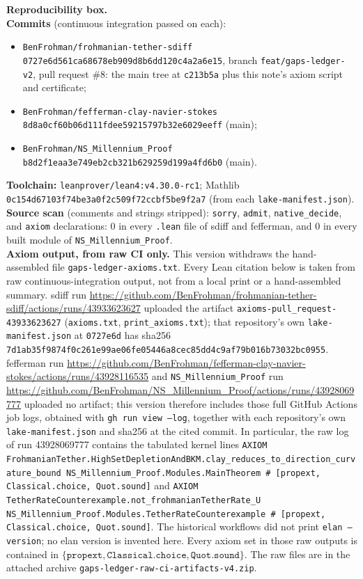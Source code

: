 \documentclass[11pt]{article}
\theoremstyle{plain}
\theoremstyle{definition}
\theoremstyle{remark}
\newcommand{\sdifffull}{0727e6d561ca68678eb909d8b6dd120c4a2a6e15}
\newcommand{\fffull}{8d8a0cf60b06d111fdee59215797b32e6029eeff}
\newcommand{\nsfull}{b8d2f1eaa3e749eb2cb321b629259d199a4fd6b0}
\begin{document}
\begin{framed}\small
\noindent\textbf{Reproducibility box.}\\[2pt]
\textbf{Commits} (continuous integration passed on each):
\begin{itemize}[leftmargin=1.2em,itemsep=0pt,topsep=2pt]
\item \texttt{BenFrohman/frohmanian-tether-sdiff} \nolinkurl{\sdifffull}, branch \texttt{feat/gaps-ledger-v2}, pull request \#8: the main tree at \texttt{c213b5a} plus this note's axiom script and certificate;
\item \texttt{BenFrohman/fefferman-clay-navier-stokes} \nolinkurl{\fffull} (main);
\item \texttt{BenFrohman/NS\_Millennium\_Proof} \nolinkurl{\nsfull} (main).
\end{itemize}
\textbf{Toolchain:} \texttt{leanprover/lean4:v4.30.0-rc1}; Mathlib \nolinkurl{0c154d67103f74be3a0f2c509f72ccbf5be9f2a7} (from each \texttt{lake-manifest.json}).\\[2pt]
\textbf{Source scan} (comments and strings stripped): \texttt{sorry}, \texttt{admit}, \texttt{native\_decide}, and \texttt{axiom} declarations: 0 in every \texttt{.lean} file of sdiff and fefferman, and 0 in every built module of \texttt{NS\_Millennium\_Proof}.\\[2pt]
\textbf{Axiom output, from raw CI only.} This version withdraws the hand-assembled file \texttt{gaps-ledger-axioms.txt}. Every Lean citation below is taken from raw continuous-integration output, not from a local print or a hand-assembled summary. sdiff run \url{https://github.com/BenFrohman/frohmanian-tether-sdiff/actions/runs/43933623627} uploaded the artifact \texttt{axioms-pull\_request-43933623627} (\texttt{axioms.txt}, \texttt{print\_axioms.txt}); that repository's own \texttt{lake-manifest.json} at \texttt{0727e6d} has sha256 \texttt{7d1ab35f9874f0c261e99ae06fe05446a8cec85dd4c9af79b016b73032bc0955}. fefferman run \url{https://github.com/BenFrohman/fefferman-clay-navier-stokes/actions/runs/43928116535} and \texttt{NS\_Millennium\_Proof} run \url{https://github.com/BenFrohman/NS\_Millennium\_Proof/actions/runs/43928069777} uploaded no artifact; this version therefore includes those full GitHub Actions job logs, obtained with \texttt{gh run view --log}, together with each repository's own \texttt{lake-manifest.json} and sha256 at the cited commit. In particular, the raw log of run 43928069777 contains the tabulated kernel lines \texttt{AXIOM FrohmanianTether.HighSetDepletionAndBKM.clay\_reduces\_to\_direction\_curvature\_bound NS\_Millennium\_Proof.Modules.MainTheorem \# [propext, Classical.choice, Quot.sound]} and \texttt{AXIOM TetherRateCounterexample.not\_frohmanianTetherRate\_U NS\_Millennium\_Proof.Modules.TetherRateCounterexample \# [propext, Classical.choice, Quot.sound]}. The historical workflows did not print \texttt{elan --version}; no elan version is invented here. Every axiom set in those raw outputs is contained in \(\{\texttt{propext},\texttt{Classical.choice},\texttt{Quot.sound}\}\). The raw files are in the attached archive \texttt{gaps-ledger-raw-ci-artifacts-v4.zip}.\\[2pt]

\end{framed}
\end{document}
